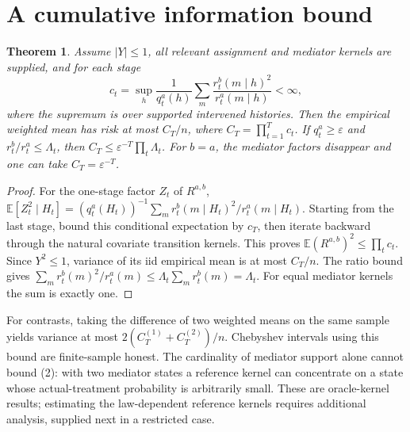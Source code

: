 \documentclass[11pt]{article}
\newtheorem{theorem}{Theorem}
\theoremstyle{definition}
\begin{document}
\section*{A cumulative information bound}
\begin{theorem}
Assume $|Y|\le1$, all relevant assignment and mediator kernels are supplied,
and for each stage
\[
 c_t=\sup_{h}\frac1{q_t^a(h)}
             \sum_m\frac{r_t^b(m\mid h)^2}{r_t^a(m\mid h)}<\infty,
                                                               \tag{2}
\]
where the supremum is over supported intervened histories.
Then the empirical weighted mean has risk at most
$C_T/n$, where $C_T=\prod_{t=1}^T c_t$.
If $q_t^a\ge\varepsilon$ and $r_t^b/r_t^a\le\Lambda_t$,
then $C_T\le\varepsilon^{-T}\prod_t\Lambda_t$.
For $b=a$, the mediator factors disappear and one can take
$C_T=\varepsilon^{-T}$.
\end{theorem}
\begin{proof}
For the one-stage factor $Z_t$ of $R^{a,b}$,
$\mathbb E[Z_t^2\mid H_t]=
(q_t^a(H_t))^{-1}\sum_m r_t^b(m\mid H_t)^2/r_t^a(m\mid H_t)$.
Starting from the last stage, bound this conditional expectation by $c_T$,
then iterate backward through the natural covariate transition kernels.
This proves $\mathbb E(R^{a,b})^2\le\prod_t c_t$.
Since $Y^2\le1$, variance of its iid empirical mean is at most $C_T/n$.
The ratio bound gives
$\sum_m r_t^b(m)^2/r_t^a(m)\le\Lambda_t\sum_mr_t^b(m)=\Lambda_t$.
For equal mediator kernels the sum is exactly one.
\end{proof}
For contrasts, taking the difference of two weighted means on the same
sample yields variance at most $2(C_T^{(1)}+C_T^{(2)})/n$.
Chebyshev intervals using this bound are finite-sample honest.
The cardinality of mediator support alone cannot bound (2): with two
mediator states a reference kernel can concentrate on a state whose
actual-treatment probability is arbitrarily small.
These are oracle-kernel results; estimating the law-dependent reference
kernels requires additional analysis, supplied next in a restricted case.
\end{document}
